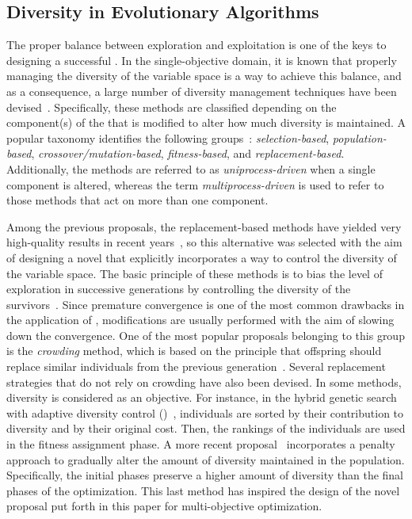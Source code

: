 \subsection{Diversity in Evolutionary Algorithms}

The proper balance between exploration and exploitation is one of the keys to designing a successful \EAS{}.
%
In the single-objective domain, it is known that properly managing the diversity of the variable space is a way to achieve this balance,
and as a consequence, a large number of diversity management techniques have been devised~\cite{pandey2014comparative}.
%
Specifically, these methods are classified depending on the component(s) of the \EA{} that is modified to alter how much diversity is maintained.
%
A popular taxonomy identifies the following groups~\cite{Joel:Crepinsek}: \textit{selection-based}, \textit{population-based}, 
\textit{crossover/mutation-based}, \textit{fitness-based}, and \textit{replacement-based}.
%
Additionally, the methods are referred to as \textit{uniprocess-driven} when a single component is altered, whereas the term
\textit{multiprocess-driven} is used to refer to those methods that act on more than one component.

Among the previous proposals, the replacement-based methods have yielded very high-quality results in recent years~\cite{segura2016improving}, so
this alternative was selected with the aim of designing a novel \MOEA{} that explicitly incorporates a way to control the diversity 
of the variable space.
%
The basic principle of these methods is to bias the level of exploration in successive generations by 
controlling the diversity of the survivors~\cite{segura2016improving}.
%
Since premature convergence is one of the most common drawbacks in the application of \EAS{}, 
modifications are usually performed with the aim of slowing down the convergence.
%
One of the most popular proposals belonging to this group is the \textit{crowding} method, which
is based on the principle that offspring should replace similar individuals from the previous generation~\cite{mengshoel2014adaptive}.
%
Several replacement strategies that do not rely on crowding have also been devised.
%
In some methods, diversity is considered as an objective.
%
For instance, in the hybrid genetic search with adaptive diversity control (\HGSADC{})~\cite{vidal2013hybrid}, individuals are sorted 
by their contribution to diversity and by their original cost.
%
Then, the rankings of the individuals are used in the fitness assignment phase.
%
A more recent proposal~\cite{segura2016improving} incorporates a penalty approach to gradually alter the amount of diversity 
maintained in the population.
%
Specifically, the initial phases preserve a higher amount of diversity than the final phases of the optimization.
%
This last method has inspired the design of the novel proposal put forth in this paper for multi-objective optimization.
%

